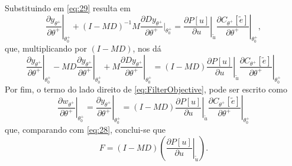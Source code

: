 Substituindo em \eqref{eq:29} resulta em
\begin{equation}
   \left.\frac{\partial y_{\theta^{+}}}{\partial \theta^{+}}\right|_{\theta_{0}^{+}}+(I-M D)^{-1} M \frac{\partial D y_{\theta^{+}}}{\partial \theta^{+}} \left.\right|_{\theta_{0}^{+}}
   =\left.\left.\frac{\partial P[u]}{\partial u}\right|_{\tilde{u}} \frac{\partial C_{\theta^{+}}[\tilde{e}]}{\partial \theta^{+}}\right|_{\theta_{0}^{+}},
\end{equation}
que, multiplicando por $(I-MD)$, nos dá
\begin{equation}
   \left.\frac{\partial y_{\theta^{+}}}{\partial \theta^{+}}\right|_{\theta_{0}^{+}}-\left.M D \frac{\partial y_{\theta^{+}}}{\partial \theta^{+}}\right|_{\theta_{0}^{+}}+\left.M \frac{\partial D y_{\theta^{+}}}{\partial \theta^{+}}\right|_{\theta_{0}^{+}}
   =\left.\left.(I-M D) \frac{\partial P[u]}{\partial u}\right|_{\tilde{u}} \frac{\partial C_{\theta^{+}}[\tilde{e}]}{\partial \theta^{+}}\right|_{\theta_{0}^{+}}
\end{equation}
Por fim, o termo do lado direito de \eqref{eq:FilterObjective}, pode ser escrito como
\begin{equation}
   \left.\frac{\partial w_{\theta^{+}}}{\partial \theta^{+}}\right|_{\theta_{0}^{+}} =\left.\frac{\partial y_{\theta^{+}}}{\partial \theta^{+}}\right|_{\theta_{0}^{+}} 
   =\left.\left.(I-M D) \frac{\partial P[u]}{\partial u}\right|_{\tilde{u}} \frac{\partial C_{\theta^{+}}[\tilde{e}]}{\partial \theta^{+}}\right|_{\theta_{0}^{+}}
\end{equation}
que, comparando com \eqref{eq:28}, conclui-se que
\begin{equation}
   F=(I-M D)\left(\left.\frac{\partial P[u]}{\partial u}\right|_{\tilde{u}}\right) .
\label{eq:FiltroFinal}
\end{equation}


